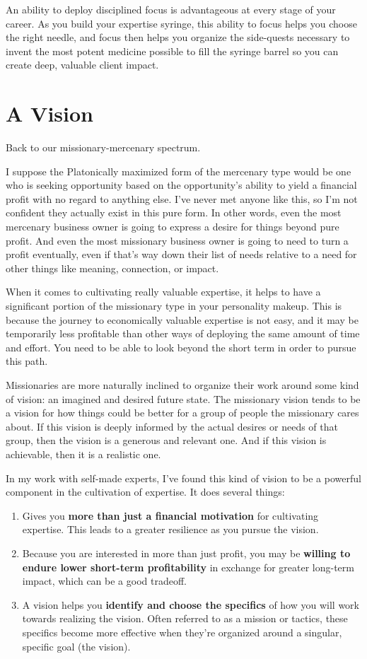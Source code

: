 An ability to deploy disciplined focus is advantageous at every stage of your career. As you build your expertise syringe, this ability to focus helps you choose the right needle, and focus then helps you organize the side-quests necessary to invent the most potent medicine possible to fill the syringe barrel so you can create deep, valuable client impact.

\section{A Vision}

Back to our missionary-mercenary spectrum.

I suppose the Platonically maximized form of the mercenary type would be one who is seeking opportunity based on the opportunity's ability to yield a financial profit with no regard to anything else. I've never met anyone like this, so I'm not confident they actually exist in this pure form. In other words, even the most mercenary business owner is going to express a desire for things beyond pure profit. And even the most missionary business owner is going to need to turn a profit eventually, even if that's way down their list of needs relative to a need for other things like meaning, connection, or impact.

When it comes to cultivating really valuable expertise, it helps to have a significant portion of the missionary type in your personality makeup. This is because the journey to economically valuable expertise is not easy, and it may be temporarily less profitable than other ways of deploying the same amount of time and effort. You need to be able to look beyond the short term in order to pursue this path.

Missionaries are more naturally inclined to organize their work around some kind of vision: an imagined and desired future state. The missionary vision tends to be a vision for how things could be better for a group of people the missionary cares about. If this vision is deeply informed by the actual desires or needs of that group, then the vision is a generous and relevant one. And if this vision is achievable, then it is a realistic one.

In my work with self-made experts, I've found this kind of vision to be a powerful component in the cultivation of expertise. It does several things:

\begin{enumerate}
\item Gives you \textbf{more than just a financial motivation} for cultivating expertise. This leads to a greater resilience as you pursue the vision.
\item Because you are interested in more than just profit, you may be \textbf{willing to endure lower short-term profitability} in exchange for greater long-term impact, which can be a good tradeoff.
\item A vision helps you \textbf{identify and choose the specifics} of how you will work towards realizing the vision. Often referred to as a mission or tactics, these specifics become more effective when they're organized around a singular, specific goal (the vision).
\end{enumerate}


